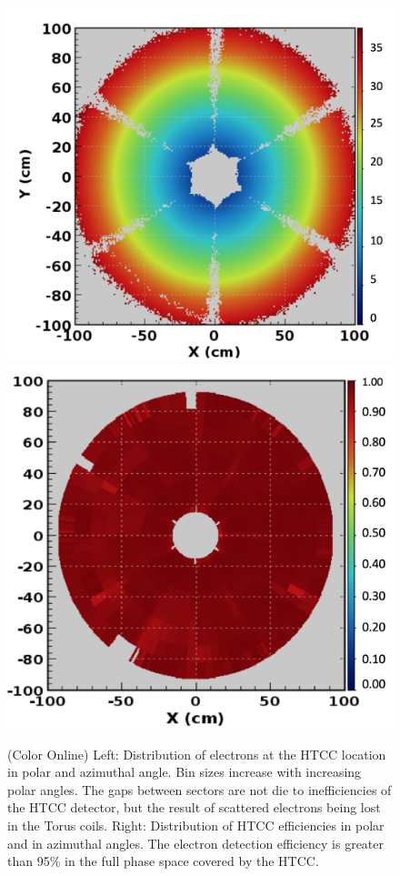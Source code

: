 \documentclass[final,3p,twocolumn]{elsarticle}
\begin{document}
\begin{figure}[htbp!]
{\includegraphics[width=1.0\columnwidth]{htcc-dis.png}}
{\includegraphics[width=0.96\columnwidth]{htcc-eff.png}}
\caption{(Color Online) Left: Distribution of electrons at the HTCC location in polar and azimuthal angle. Bin sizes increase with
increasing polar angles. The gaps between sectors are not die to inefficiencies of the HTCC detector, but the result
of scattered electrons being lost in the Torus coils. Right: Distribution of HTCC efficiencies in polar and in azimuthal
angles. The electron detection efficiency is greater than 95\% in the full phase space covered by the HTCC.} 
\label{htcc-eff}
\end{figure}
\end{document}

